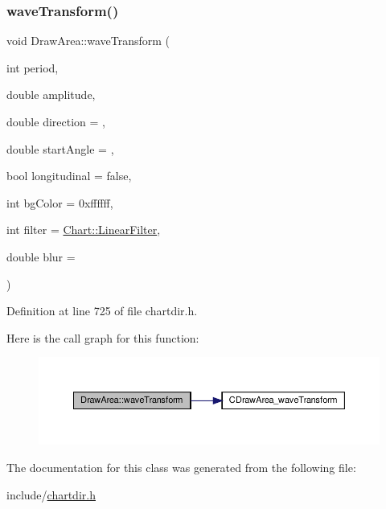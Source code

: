 \subsubsection{\texorpdfstring{wave\+Transform()}{waveTransform()}}
{\footnotesize\ttfamily void Draw\+Area\+::wave\+Transform (\begin{DoxyParamCaption}\item[{int}]{period,  }\item[{double}]{amplitude,  }\item[{double}]{direction = {},  }\item[{double}]{start\+Angle = {},  }\item[{bool}]{longitudinal = {\ttfamily false},  }\item[{int}]{bg\+Color = {\ttfamily 0xffffff},  }\item[{int}]{filter = {\ttfamily \hyperlink{namespace_chart_ab75b9aa1781d0e0159ef1d441b577764a8cd729b7a982bac2dce8b021511e3ac6}{Chart\+::\+Linear\+Filter}},  }\item[{double}]{blur = {} }\end{DoxyParamCaption})\hspace{0.3cm}{\ttfamily [inline]}}



Definition at line 725 of file chartdir.\+h.

Here is the call graph for this function\+:
\nopagebreak
\begin{figure}[H]
\begin{center}
\leavevmode
\includegraphics[width=350pt]{class_draw_area_aa5f8289cb7562641389d28b799ff441e_cgraph}
\end{center}
\end{figure}


The documentation for this class was generated from the following file\+:\begin{DoxyCompactItemize}
\item 
include/\hyperlink{chartdir_8h}{chartdir.\+h}\end{DoxyCompactItemize}
